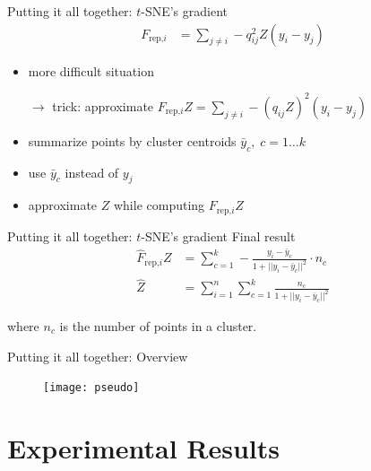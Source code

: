 \documentclass{beamer}
\begin{document}
\begin{frame}[fragile]{Putting it all together: $t$-SNE's gradient}
    \begin{align*}
        F_\text{rep,$i$} &= \sum_{j \neq i} -q_{ij}^2Z(y_i - y_j)
    \end{align*}

    \begin{itemize}
        \item more difficult situation
        \item[$\rightarrow$] trick: approximate $F_\text{rep,$i$}Z = \sum_{j \neq i} -(q_{ij}Z)^2(y_i - y_j)$
            \bigskip
        \item summarize points by cluster centroids $\bar{y}_c, \; c = 1\ldots k$
        \item use $\bar{y}_c$ instead of $y_j$
        \item approximate $Z$ while computing $F_\text{rep,$i$}Z$
    \end{itemize}
\end{frame}

\begin{frame}[fragile]{Putting it all together: $t$-SNE's gradient}
    \quad Final result
    \begin{align*}
        \hat{F}_\text{rep,$i$}Z &= \sum_{c=1}^{k} - \frac{y_i - \bar{y}_c}{1 + ||y_i - \bar{y}_c||^2} \cdot n_c \\
        \hat{Z} &= \sum_{i = 1}^{n} \sum_{c=1}^{k} \frac{n_c}{1 + ||y_i - \bar{y}_c||^2}
    \end{align*}

    \quad where $n_c$ is the number of points in a cluster.
\end{frame}

\begin{frame}[fragile]{Putting it all together: Overview}
    \begin{figure}[h]
        \centering
        \texttt{[image: pseudo]}
    \end{figure}
\end{frame}

\section{Experimental Results}
\end{document}
